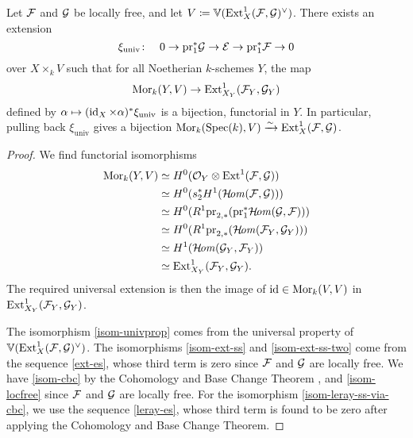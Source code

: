 \begin{proposition} \label{cor:universal-extension}
Let $\mathcal{F}$ and $\mathcal{G}$ be locally free, and let $V \coloneqq \mathbb{V}(\operatorname{Ext}^1_X(\mathcal{F},\mathcal{G})^\vee)$. There exists an extension
	\[
		\xi_{\mathrm{univ}} \colon \quad 0 \to \mathrm{pr}_1^{*}\mathcal{G} \to \mathcal{E} \to \mathrm{pr}_1^{*}\mathcal{F} \to 0
	\]
over $X\times_k V$
such that for all Noetherian $k$-schemes $Y$, the map
$$\operatorname{Mor}_{k}(Y,V)\to\operatorname{Ext}^1_{X_Y}(\mathcal{F}_Y,\mathcal{G}_Y)$$ defined by
$\alpha \mapsto (\operatorname{id}_X\times \alpha)^{*} \xi_{\mathrm{univ}}$
is a bijection, functorial in $Y$.
In particular, pulling back $\xi_{\text{univ}}$ gives a bijection $\operatorname{Mor}_{k}(\operatorname{Spec}(k),V)\xrightarrow{\sim} \operatorname{Ext}^1_{X}(\mathcal{F},\mathcal{G})$.
\end{proposition}

\begin{proof}
We find functorial isomorphisms
\begin{align}
\operatorname{Mor}_{k}(Y,V)
& \simeq H^0(\mathcal{O}_Y \otimes \operatorname{Ext}^1(\mathcal{F},\mathcal{G})) \label{isom-univprop} \\
& \simeq H^0(s_{2}^* H^1(\mathcal{H}\!\mathit{om}(\mathcal{F},\mathcal{G}))) \label{isom-ext-ss} \\
& \simeq H^0(R^1 \mathrm{pr}_{2,*}(\mathrm{pr}_1^* \mathcal{H}\!\mathit{om}(\mathcal{G},\mathcal{F}))) \label{isom-cbc} \\
& \simeq H^0(R^1 \mathrm{pr}_{2,*}(\mathcal{H}\!\mathit{om}(\mathcal{F}_Y,\mathcal{G}_Y))) \label{isom-locfree}\\
& \simeq H^1(\mathcal{H}\!\mathit{om}(\mathcal{G}_Y,\mathcal{F}_Y)) \label{isom-leray-ss-via-cbc}\\
& \simeq \operatorname{Ext}^1_{X_Y}(\mathcal{F}_Y,\mathcal{G}_Y) \label{isom-ext-ss-two}.
\end{align}
The required universal extension is then the image of $\operatorname{id}\in\operatorname{Mor}_{k}(V,V)$ in $\operatorname{Ext}^1_{X_Y}(\mathcal{F}_Y,\mathcal{G}_Y)$.

The isomorphism \cref{isom-univprop} comes from the universal property of $\mathbb{V}(\operatorname{Ext}^1_X(\mathcal{F},\mathcal{G})^\vee)$. The isomorphisms \cref{isom-ext-ss} and \cref{isom-ext-ss-two} come from the sequence \cref{ext-es}, whose third term is zero since $\mathcal{F}$ and $\mathcal{G}$ are locally free. We have \cref{isom-cbc} by the Cohomology and Base Change Theorem \cite[{}28.1.6]{vakil-algebraic-geometry}, and \cref{isom-locfree} since $\mathcal{F}$ and $\mathcal{G}$ are locally free. For the isomorphism \cref{isom-leray-ss-via-cbc}, we use the sequence \cref{leray-es}, whose third term is found to be zero after applying the Cohomology and Base Change Theorem.
\end{proof}

